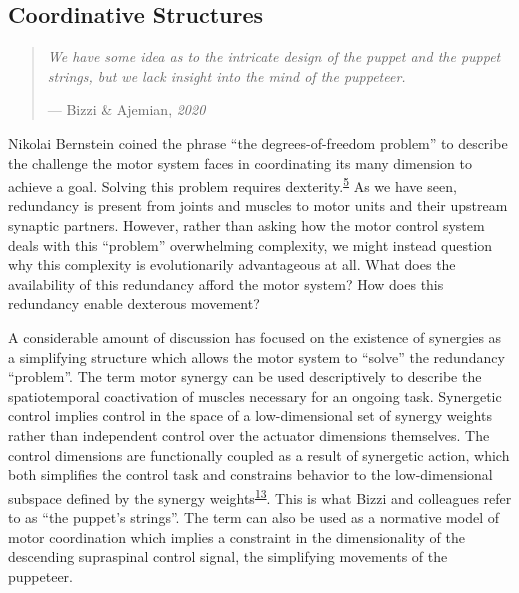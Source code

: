 \documentclass[
  a4paper,
]{article}
\begin{document}
\hypertarget{coordinative-structures}{%
\subsection{Coordinative Structures}\label{coordinative-structures}}

\begin{quote}
\emph{We have some idea as to the intricate design of the puppet and the
puppet strings, but we lack insight into the mind of the puppeteer.}

--- Bizzi \& Ajemian, \emph{2020}
\end{quote}

Nikolai Bernstein coined the phrase ``the degrees-of-freedom problem''
to describe the challenge the motor system faces in coordinating its
many dimension to achieve a goal. Solving this problem requires
dexterity.\textsuperscript{\protect\hyperlink{ref-Bernstein1967}{5}} As
we have seen, redundancy is present from joints and muscles to motor
units and their upstream synaptic partners. However, rather than asking
how the motor control system deals with this ``problem'' overwhelming
complexity, we might instead question why this complexity is
evolutionarily advantageous at all. What does the availability of this
redundancy afford the motor system? How does this redundancy enable
dexterous movement?

A considerable amount of discussion has focused on the existence of
synergies as a simplifying structure which allows the motor system to
``solve'' the redundancy ``problem''. The term motor synergy can be used
descriptively to describe the spatiotemporal coactivation of muscles
necessary for an ongoing task. Synergetic control implies control in the
space of a low-dimensional set of synergy weights rather than
independent control over the actuator dimensions themselves. The control
dimensions are functionally coupled as a result of synergetic action,
which both simplifies the control task and constrains behavior to the
low-dimensional subspace defined by the synergy
weights\textsuperscript{\protect\hyperlink{ref-merelHierarchicalMotorControl2019}{13}}.
This is what Bizzi and colleagues refer to as ``the puppet's strings''.
The term can also be used as a normative model of motor coordination
which implies a constraint in the dimensionality of the descending
supraspinal control signal, the simplifying movements of the puppeteer.
\end{document}
